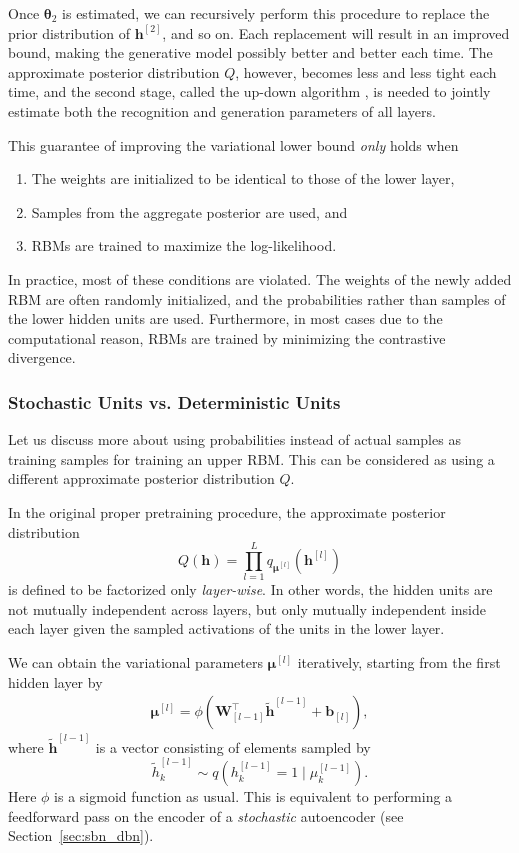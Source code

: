 \documentclass[dissertation,nocontribution]{aaltoseries}
\newcommand{\qlay}[1]{\left[#1\right]}
\newcommand{\vect}[1]{\mathbf{#1}}
\newcommand{\vects}[1]{\boldsymbol{#1}}
\newcommand{\matr}[1]{\mathbf{#1}}
\newcommand{\vb}[0]{\vect{b}}
\newcommand{\vh}[0]{\vect{h}}
\newcommand{\mW}[0]{\matr{W}}
\newcommand{\vmu}[0]{\vects{\mu}}
\newcommand{\TT}[0]{{\vects{\theta}}}
\begin{document}
Once $\TT_2$ is estimated, we can recursively perform this
procedure to replace the prior distribution of
$\vh^{\qlay{2}}$, and so on.  Each replacement will result
in an improved bound, making the generative model possibly
better and better each time.  The approximate posterior
distribution $Q$, however, becomes less and less tight each
time, and the second stage, called the up-down algorithm
\citep{Hinton2006nc}, is needed to jointly estimate both the
recognition and generation parameters of all layers.  

This guarantee of improving the variational lower bound
\textit{only} holds when
\begin{enumerate}
        \vspace{-5mm}
    \itemsep 0em
    \item The weights are initialized to be identical to
        those of the lower layer,
    \item Samples from the aggregate posterior are used, and
    \item RBMs are trained to maximize the log-likelihood.
\end{enumerate}

In practice, most of these conditions are violated. The weights
of the newly added RBM are often randomly initialized, and
the probabilities rather than samples of the lower hidden
units are used. Furthermore, in most cases due to the
computational reason, RBMs are trained by minimizing the
contrastive divergence. 

\subsubsection{Stochastic Units vs. Deterministic Units}
\label{sec:det_vs_sto}

Let us discuss more about using probabilities
instead of actual samples as training samples for training
an upper RBM. This can be considered as using a different
approximate posterior distribution $Q$.

In the original proper pretraining procedure, the
approximate posterior distribution
\[
Q(\vh) = \prod_{l=1}^L q_{\vmu^{\qlay{l}}}\left(
\vh^{\qlay{l}} \right)
\]
is defined to be factorized only \textit{layer-wise}. In
other words, the hidden units are not mutually independent
across layers, but only mutually independent inside each
layer given the sampled activations of the units in the
lower layer.

We can obtain the variational parameters
$\vmu^{\qlay{l}}$ iteratively, starting from the first hidden
layer by
\begin{align}
    \label{eq:dbn_posterior}
    \vmu^{\qlay{l}} = \phi\left( \mW_{\qlay{l-1}}^\top
    \tilde{\vh}^{\qlay{l-1}} + \vb_{\qlay{l}} \right),
\end{align}
where $\tilde{\vh}^{\qlay{l-1}}$ is a vector consisting of
elements sampled by 
\[
\tilde{h}_k^{\qlay{l-1}} \sim q\left(h_k^{\qlay{l-1}} = 1 \mid
\mu_k^{\qlay{l-1}}\right).
\]
Here $\phi$ is a sigmoid function as usual. This is
equivalent to performing a feedforward pass on the encoder
of a \textit{stochastic} autoencoder (see
Section~\ref{sec:sbn_dbn}).
\end{document}
